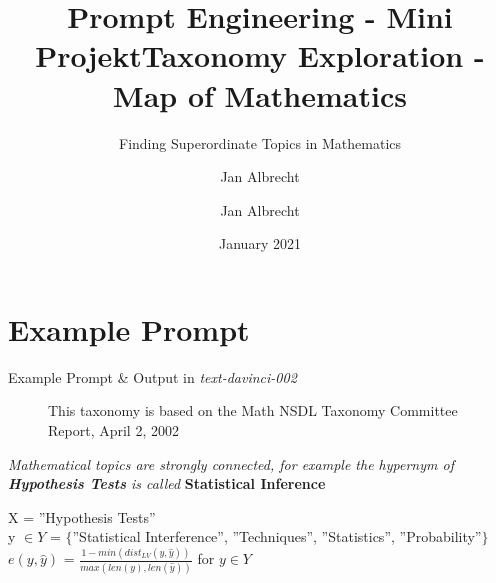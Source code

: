 \documentclass{beamer}
\title{Prompt Engineering - Mini Projekt}
\author{Jan Albrecht}
\date{January 2021}
\title[Prompt Engineering Project] %
{Taxonomy Exploration - Map of Mathematics}
\subtitle{Finding Superordinate Topics in Mathematics}
\author[J. Albrecht] %
{Jan Albrecht}
\institute[Student - University Leipzig] %
{University Leipzig}
\date[12.06.2022] %
\begin{document}
	\frame{\titlepage}
	\section{Example Prompt}
	\begin{frame}{Example Prompt \& Output in \textit{text-davinci-002}}
		\begin{figure}
			\captionsetup[wrapfigure]{font=small}
			\caption{This taxonomy is based on the Math NSDL Taxonomy Committee Report, April 2, 2002}
			\label{fig:tax}
		\end{figure}

		\textit{Mathematical topics are strongly connected, for example the hypernym of \textbf{Hypothesis Tests} is called} \color{forestgreen} \textbf{Statistical Inference}\\[30pt] \color{black}
	
		X = ''Hypothesis Tests''\\[6pt]
		y $\in Y$ = $\{$''Statistical Interference'', ''Techniques'', ''Statistics'', ''Probability''$\}$\\[6pt]
		$e(y,\hat{y})$ = $\frac{1 - min(dist_{LV}(y, \hat{y}))}{max(len(y),len(\hat{y}))}$ for $y \in Y$\\[48pt]
	\end{frame}
\end{document}
